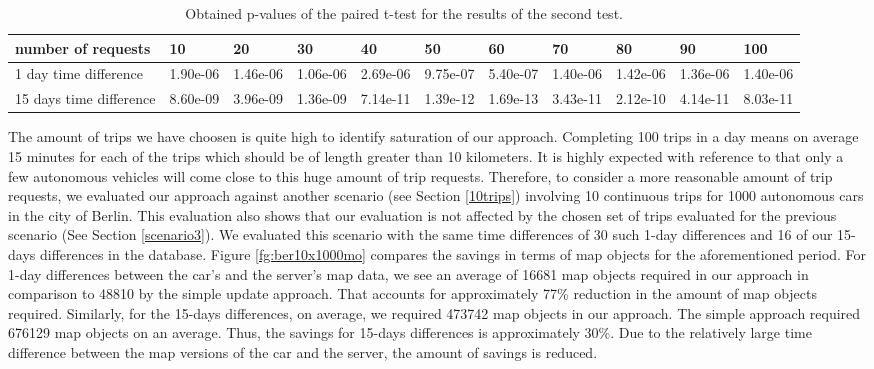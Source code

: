 \begin{table*}
\caption{Obtained p-values of the paired t-test for the results of the second test.}
\begin{scriptsize}
\centering
\begin{tabular}
{p{1.5cm}p{1cm}p{1cm}p{1cm}p{1cm}p{1cm}p{1cm}p{1cm}p{1cm}p{1cm}p{1cm}}
number of requests&	10  & 20  & 30  & 40 & 50 & 60 & 70 & 80 & 90 & 100 \\ 
\hline 
1 day time difference & 1.90e-06 & 1.46e-06 & 1.06e-06 & 2.69e-06 & 9.75e-07 & 5.40e-07 & 1.40e-06 & 1.42e-06 & 1.36e-06 & 1.40e-06 \\ 
\hline 
15 days time difference &	8.60e-09 & 3.96e-09& 1.36e-09 &7.14e-11& 1.39e-12 &1.69e-13 &3.43e-11 &2.12e-10 &4.14e-11 &8.03e-11 \\
\end{tabular}
\end{scriptsize}
\label{tablettest}
\end{table*}





The amount of trips we have choosen is quite high to identify saturation of our approach. Completing 100 trips in a day means on average 15 minutes for each of the trips which should be of length greater than 10 kilometers. It is highly expected with reference to \cite{pasaoglu_driving_2012} that only a few autonomous vehicles will come close to this huge amount of trip requests. Therefore, to consider a more reasonable amount of trip requests, we evaluated our approach against another scenario (see Section \ref{10trips}) involving 10 continuous trips for 1000 autonomous cars in the city of Berlin. This evaluation also shows that our evaluation is not affected by the chosen set of trips evaluated for the previous scenario (See Section \ref{scenario3}). We evaluated this scenario with the same time differences of 30 such 1-day differences and 16 of our 15-days differences in the database. Figure \ref{fg:ber10x1000mo} compares the savings in terms of map objects for the aforementioned period. For 1-day differences between the car's and the server's map data, we see an average of 16681 map objects required in our approach in comparison to 48810 by the simple update approach. That accounts for approximately 77\% reduction in the amount of map objects required. Similarly, for the 15-days differences, on average, we required 473742 map objects in our approach. The simple approach required 676129 map objects on an average. Thus, the savings for 15-days differences is approximately 30\%. Due to the relatively large time difference between the map versions of the car and the server, the amount of savings is reduced. 

